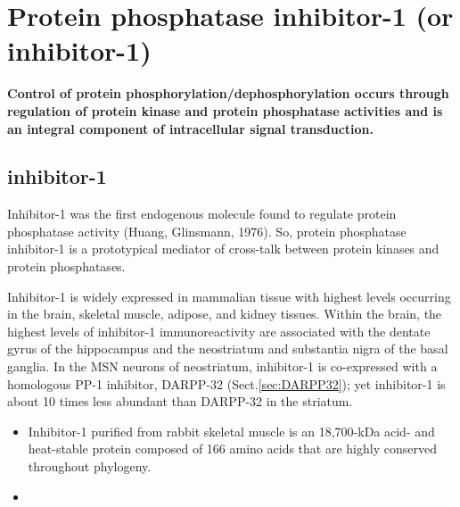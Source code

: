 \section{Protein phosphatase inhibitor-1 (or inhibitor-1)}
\label{sec:protein-phosphatase-inhibitor-1}


{\bf Control of protein phosphorylation/dephosphorylation occurs through
regulation of protein kinase and protein phosphatase activities and is an
integral component of intracellular signal transduction.}

\subsection{inhibitor-1}
\label{sec:inhibitor-1}

Inhibitor-1 was the first endogenous molecule found to regulate protein
phosphatase activity (Huang, Glinsmann, 1976). So, protein phosphatase
inhibitor-1 is a prototypical mediator of cross-talk between protein kinases and
protein phosphatases.

Inhibitor-1 is widely expressed in mammalian tissue with highest levels
occurring in the brain, skeletal muscle, adipose, and kidney tissues.
Within the brain, the highest levels of inhibitor-1 immunoreactivity are
associated with the dentate gyrus of the hippocampus and the neostriatum and
substantia nigra of the basal ganglia. In the MSN neurons of neostriatum,
inhibitor-1 is co-expressed with a homologous PP-1 inhibitor, DARPP-32
(Sect.\ref{sec:DARPP32}); yet  inhibitor-1 is about 10 times less abundant than
DARPP-32 in the striatum.

\begin{itemize}
  \item Inhibitor-1 purified from rabbit skeletal muscle is an 18,700-kDa acid-
  and heat-stable protein composed of 166 amino acids that are highly conserved
  throughout phylogeny.
  
  \item 
\end{itemize}

